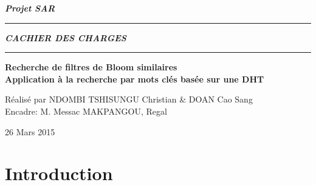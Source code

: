 \documentclass[a4paper,12pt]{report}
\begin{document}
	\begin{titlepage}
		\begin{center}
			\large\bfseries\itshape Projet SAR\\
		\end{center}
		\noindent\rule{\linewidth}{3pt}

		\begin{center}
			\Huge\bfseries\itshape CACHIER DES CHARGES\\
		\end{center}
		
		\noindent\rule{\linewidth}{3pt}
		\begin{center}
			\bfseries
			\large Recherche de filtres de Bloom similaires \\
			\large Application à la recherche par mots clés basée sur une DHT
		\end{center}
		\begin{center}
			Réalisé par NDOMBI TSHISUNGU Christian \& DOAN Cao Sang \\
			Encadre: M. Messac MAKPANGOU, Regal
		\end{center}
		\begin{center}
			26 Mars 2015
		\end{center}
	\end{titlepage}

\tableofcontents

\chapter{Introduction}
\end{document}
